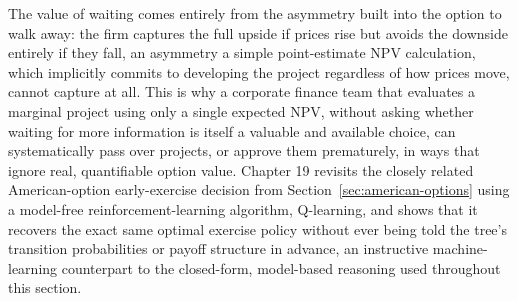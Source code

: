 \documentclass[../ai_in_finance]{subfiles}
\begin{document}
The value of waiting comes entirely from the asymmetry built into the option to walk away: the firm captures the full upside if prices rise but avoids the downside entirely if they fall, an asymmetry a simple point-estimate NPV calculation, which implicitly commits to developing the project regardless of how prices move, cannot capture at all.
This is why a corporate finance team that evaluates a marginal project using only a single expected NPV, without asking whether waiting for more information is itself a valuable and available choice, can systematically pass over projects, or approve them prematurely, in ways that ignore real, quantifiable option value. Chapter 19 revisits the closely related American-option early-exercise decision from Section~\ref{sec:american-options} using a model-free reinforcement-learning algorithm, Q-learning, and shows that it recovers the exact same optimal exercise policy without ever being told the tree's transition probabilities or payoff structure in advance, an instructive machine-learning counterpart to the closed-form, model-based reasoning used throughout this section.
\end{document}
